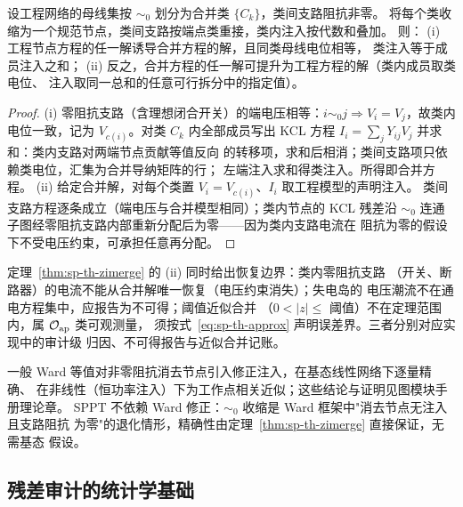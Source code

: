 \begin{theorem}[零阻抗合并保持潮流解]\label{thm:sp-th-zimerge}
设工程网络的母线集按 $\sim_0$ 划分为合并类 $\{C_k\}$，类间支路阻抗非零。
将每个类收缩为一个规范节点，类间支路按端点类重接，类内注入按代数和叠加。
则：
(i) 工程节点方程的任一解诱导合并方程的解，且同类母线电位相等，
类注入等于成员注入之和；
(ii) 反之，合并方程的任一解可提升为工程方程的解（类内成员取类电位、
注入取同一总和的任意可行拆分中的指定值）。
\end{theorem}
\begin{proof}
(i) 零阻抗支路（含理想闭合开关）的端电压相等：$i\sim_0 j\Rightarrow
V_i=V_j$，故类内电位一致，记为 $V_{c(i)}$。对类 $C_k$ 内全部成员写出
KCL 方程 $I_i=\sum_j Y_{ij}V_j$ 并求和：类内支路对两端节点贡献等值反向
的转移项，求和后相消；类间支路项只依赖类电位，汇集为合并导纳矩阵的行；
左端注入求和得类注入。所得即合并方程。
(ii) 给定合并解，对每个类置 $V_i=V_{c(i)}$、$I_i$ 取工程模型的声明注入。
类间支路方程逐条成立（端电压与合并模型相同）；类内节点的 KCL 残差沿
$\sim_0$ 连通子图经零阻抗支路内部重新分配后为零——因为类内支路电流在
阻抗为零的假设下不受电压约束，可承担任意再分配。
\end{proof}

\begin{remark}[三类不可恢复量]
定理~\ref{thm:sp-th-zimerge} 的 (ii) 同时给出恢复边界：类内零阻抗支路
（开关、断路器）的电流不能从合并解唯一恢复（电压约束消失）；失电岛的
电压潮流不在通电方程集中，应报告为不可得；阈值近似合并
（$0<|z|\le$ 阈值）不在定理范围内，属 $\mathcal O_{\rm ap}$ 类可观测量，
须按式~\eqref{eq:sp-th-approx} 声明误差界。三者分别对应实现中的审计级
归因、不可得报告与近似合并记账。
\end{remark}

\begin{remark}
一般 Ward 等值对非零阻抗消去节点引入修正注入，在基态线性网络下逐量精确、
在非线性（恒功率注入）下为工作点相关近似；这些结论与证明见图模块手册理论章。
SPPT 不依赖 Ward 修正：$\sim_0$ 收缩是 Ward 框架中"消去节点无注入且支路阻抗
为零"的退化情形，精确性由定理~\ref{thm:sp-th-zimerge} 直接保证，无需基态
假设。
\end{remark}

\subsection{残差审计的统计学基础}\label{sec:sp-th-residual}

